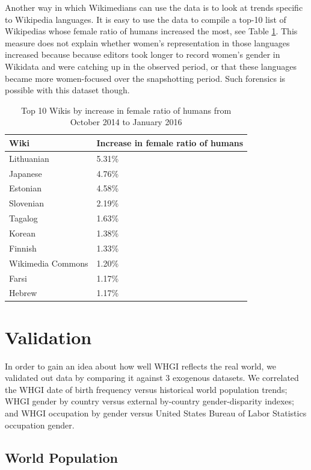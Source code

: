 \documentclass[letterpaper]{article}
\begin{document}
Another way in which Wikimedians can use the data is to look at trends specific to Wikipedia languages. It is easy to use the data to compile a top-10 list of Wikipedias whose female ratio of humans increased the most, see Table \ref{table:top10}. This measure does not explain whether women's representation in those languages increased because because editors took longer to record women's gender in Wikidata and were catching up in the observed period, or that these languages became more women-focused over the snapshotting period. Such forensics is possible with this dataset though.

\begin{table}
\caption{Top 10 Wikis by increase in female ratio of humans from October 2014 to January 2016}
\label{table:top10}
\begin{tabular}{p{2cm}p{2cm}}
\toprule
{Wiki} &     Increase in female ratio of humans  \\
\midrule
Lithuanian      & 5.31\% \\
Japanese     & 4.76\% \\
Estonian      & 4.58\% \\
Slovenian      & 2.19\% \\
Tagalog      & 1.63\% \\
Korean      & 1.38\% \\
Finnish      & 1.33\% \\
Wikimedia Commons & 1.20\% \\
Farsi      & 1.17\% \\
Hebrew      & 1.17\% \\
\bottomrule
\end{tabular}


\end{table}

\section{Validation}
In order to gain an idea about how well WHGI reflects the real world, we validated out data by comparing it against 3 exogenous datasets. We correlated the WHGI date of birth frequency versus historical world population trends; WHGI gender by country versus external by-country gender-disparity indexes; and WHGI occupation by gender versus United States Bureau of Labor Statistics occupation gender.

\subsection{World Population}
\end{document}
